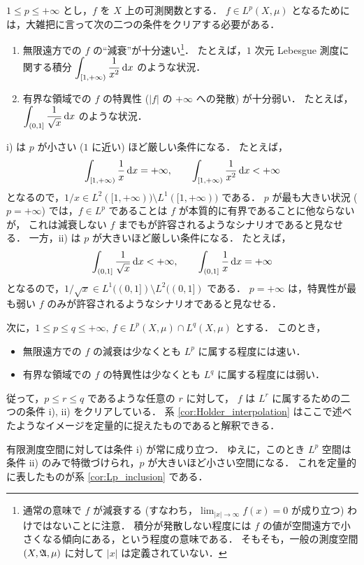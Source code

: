 \begin{remark}
    $1\le p\le+\infty$ とし，$f$ を $X$ 上の可測関数とする．
    $f\in L^p(X,\mu)$ となるためには，大雑把に言って次の二つの条件をクリアする必要がある．
    \begin{enumerate}
        \item
            無限遠方での $f$ の``減衰''が十分速い\footnote{
                通常の意味で $f$ が減衰する (すなわち，$\lim_{|x|\to\infty}f(x)=0$ が成り立つ) わけではないことに注意．
                積分が発散しない程度には $f$ の値が空間遠方で小さくなる傾向にある，という程度の意味である．
                そもそも，一般の測度空間 $(X,\mathfrak{A},\mu)$ に対して $|x|$ は定義されていない．
            }．
            たとえば，$1$ 次元 Lebesgue 測度に関する積分 $\displaystyle\int_{[1,+\infty)}\frac{1}{x^2}\,\mathrm{d} x$ のような状況．
        \item
            有界な領域での $f$ の特異性 ($|f|$ の $+\infty$ への発散) が十分弱い．
            たとえば，$\displaystyle\int_{(0,1]}\frac{1}{\sqrt x}\,\mathrm{d} x$ のような状況．
    \end{enumerate}
    \textrm{i)} は $p$ が小さい ($1$ に近い) ほど厳しい条件になる．
    たとえば，
    \begin{align*}
        \int_{[1,+\infty)}\frac{1}{x}\,\mathrm{d} x=+\infty,\qquad
        \int_{[1,+\infty)}\frac{1}{x^2}\,\mathrm{d} x<+\infty
    \end{align*}
    となるので，$1/x\in L^2([1,+\infty))\setminus L^1([1,+\infty))$ である．
    $p$ が最も大きい状況 ($p=+\infty$) では，$f\in L^p$ であることは $f$ が本質的に有界であることに他ならないが，
    これは減衰しない $f$ までもが許容されるようなシナリオであると見なせる．
    一方，\textrm{ii)} は $p$ が大きいほど厳しい条件になる．
    たとえば，
    \begin{align*}
        \int_{(0,1]}\frac{1}{\sqrt x}\,\mathrm{d} x<+\infty,\qquad
        \int_{(0,1]}\frac{1}{x}\,\mathrm{d} x=+\infty
    \end{align*}
    となるので，$1/\sqrt x\in L^1((0,1])\setminus L^2((0,1])$ である．
    $p=+\infty$ は，特異性が最も弱い $f$ のみが許容されるようなシナリオであると見なせる．

    次に，$1\le p\le q\le+\infty,\ f\in L^p(X,\mu)\cap L^q(X,\mu)$ とする．
    このとき，
    \begin{itemize}
        \item 無限遠方での $f$ の減衰は少なくとも $L^p$ に属する程度には速い．
        \item 有界な領域での $f$ の特異性は少なくとも $L^q$ に属する程度には弱い．
    \end{itemize}
    従って，$p\le r\le q$ であるような任意の $r$ に対して，
    $f$ は $L^r$ に属するための二つの条件 \textrm{i)}, \textrm{ii)} をクリアしている．
    系 \ref{cor:Holder_interpolation} はここで述べたようなイメージを定量的に捉えたものであると解釈できる．

    有限測度空間に対しては条件 \textrm{i)} が常に成り立つ．
    ゆえに，このとき $L^p$ 空間は条件 \textrm{ii)} のみで特徴づけられ，$p$ が大きいほど小さい空間になる．
    これを定量的に表したものが系 \ref{cor:Lp_inclusion} である．
\end{remark}

